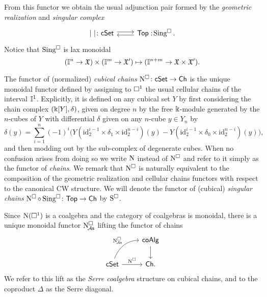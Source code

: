 From this functor we obtain the usual adjunction pair formed by the \textit{geometric realization} and \textit{singular complex}
\[
\begin{tikzcd}
	\bars{\ } \colon \cSet \arrow[r, shift left=.5ex] &
	\Top :\! \cSing. \arrow[l, shift left=.5ex]
\end{tikzcd}
\]
Notice that $\operatorname{Sing^{\square}}$ is lax monoidal
\[
(\mathbb{I}^n \to \mathfrak{X}) \times (\mathbb{I}^m \to \mathfrak{X}') \mapsto (\mathbb{I}^{n+m} \to \mathfrak{X} \times \mathfrak{X}').
\]

The functor of (normalized) \textit{cubical chains} $\operatorname{N^{\square}} \colon \mathsf{cSet} \to \mathsf{Ch}$ is the unique monoidal functor defined by assigning to $\square^1$ the usual cellular chains of the interval $\mathbb{I}^1$.
Explicitly, it is defined on any cubical set $Y$ by first considering the chain complex $(\Bbbk[Y], \delta)$, given on degree $n$ by the free $\Bbbk$-module generated by the $n$-cubes of $Y$ with differential $\delta$ given on any $n$-cube $y \in Y_n$ by
\[
\delta(y) = \sum_{i=1}^n (-1)^i
\big(
Y(\text{id}_2^{i-1} \times \delta_1 \times \text{id}_2^{n-i})(y) -
Y(\text{id}_2^{i-1} \times \delta_0 \times \text{id}_2^{n-i})(y)
\big),
\]
and then modding out by the sub-complex of degenerate cubes.
When no confusion arises from doing so we write $\operatorname{N}$ instead of $\operatorname{N^{\square}}$ and refer to it simply as the functor of \textit{chains}.
We remark that $\operatorname{N^{\square}}$ is naturally equivalent to the composition of the geometric realization and cellular chains functors with respect to the canonical CW structure.
We will denote the functor of (cubical) \textit{singular chains} $\operatorname{N^{\square}} \circ \operatorname{Sing^{\square}} \colon \mathsf{Top} \to \mathsf{Ch}$ by $\operatorname{S^{\square}}$.

Since $\operatorname{N}(\square^1)$ is a coalgebra and the category of coalgebras is monoidal, there is a unique monoidal functor $\operatorname{N^{\square}_{\!{\mathcal{A}\mathsf{s}}}}$ lifting the functor of chains
\[
\begin{tikzcd}
	& \coAlg \arrow[d] \\
	\cSet \arrow[r, "\cchains"] \arrow[ur, "\cchainsA", out=70, in=180] & \Ch.
\end{tikzcd}
\]
We refer to this lift as the \textit{Serre coalgebra} structure on cubical chains, and to the coproduct $\Delta$ as the Serre diagonal.
